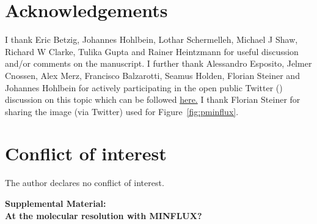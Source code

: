 \documentclass[9pt,twocolumn,twoside]{pnas-new}
\begin{document}
\section*{Acknowledgements}
I thank Eric Betzig, Johannes Hohlbein, Lothar Schermelleh, Michael J Shaw, Richard W Clarke, Tulika Gupta and Rainer Heintzmann for useful discussion and/or comments on the manuscript. I further thank Alessandro Esposito, Jelmer Cnossen, Alex Merz, Francisco Balzarotti, Seamus Holden, Florian Steiner and Johannes Hohlbein for actively participating in the open public Twitter (\faTwitter) discussion on this topic which can be followed \href{https://twitter.com/kirtiprakash25/status/1336575288122204160}{here.}
I thank Florian Steiner for sharing the image (via Twitter) used for Figure~\ref{fig:pminflux}. 

\section*{Conflict of interest}
The author declares no conflict of interest.

\small




\onehalfspacing
\onecolumn
\noindent
\textbf{\LARGE Supplemental Material: \\ At the molecular resolution with MINFLUX?}
\setcounter{figure}{0}
\setcounter{table}{0}
\makeatletter
\renewcommand{\theequation}{S\arabic{equation}}
\renewcommand{\thefigure}{S\arabic{figure}}
\renewcommand{\bibnumfmt}[1]{[S#1]}
\renewcommand{\citenumfont}[1]{S#1}

\newpage


\end{document}
